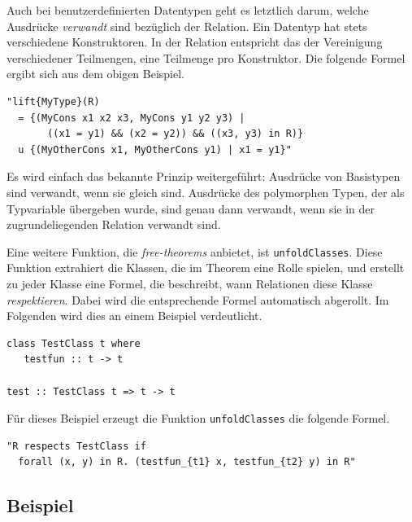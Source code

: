 Auch bei benutzerdefinierten Datentypen geht es letztlich darum, welche Ausdrücke \textit{verwandt} sind bezüglich der
Relation. Ein Datentyp hat stets verschiedene Konstruktoren. In der Relation entspricht das der Vereinigung verschiedener
Teilmengen, eine Teilmenge pro Konstruktor. Die folgende Formel ergibt sich aus dem obigen Beispiel.

\begin{verbatim}
"lift{MyType}(R)
  = {(MyCons x1 x2 x3, MyCons y1 y2 y3) |
       ((x1 = y1) && (x2 = y2)) && ((x3, y3) in R)}
  u {(MyOtherCons x1, MyOtherCons y1) | x1 = y1}"
\end{verbatim}

Es wird einfach das bekannte Prinzip weitergeführt: Ausdrücke von Basistypen sind verwandt, wenn sie gleich sind. Ausdrücke
des polymorphen Typen, der als Typvariable übergeben wurde, sind genau dann verwandt, wenn sie in der zugrundeliegenden
Relation verwandt sind.

Eine weitere Funktion, die \textit{free-theorems} anbietet, ist \texttt{unfoldClasses}. Diese Funktion extrahiert die Klassen,
die im Theorem eine Rolle spielen, und erstellt zu jeder Klasse eine Formel, die beschreibt, wann Relationen diese Klasse
\textit{respektieren}. Dabei wird die entsprechende Formel automatisch abgerollt. Im Folgenden wird dies an einem Beispiel
verdeutlicht.

\begin{verbatim}
class TestClass t where
   testfun :: t -> t

test :: TestClass t => t -> t
\end{verbatim}

Für dieses Beispiel erzeugt die Funktion \texttt{unfoldClasses} die folgende Formel.

\begin{verbatim}
"R respects TestClass if
  forall (x, y) in R. (testfun_{t1} x, testfun_{t2} y) in R"
\end{verbatim}

\subsection{Beispiel}

